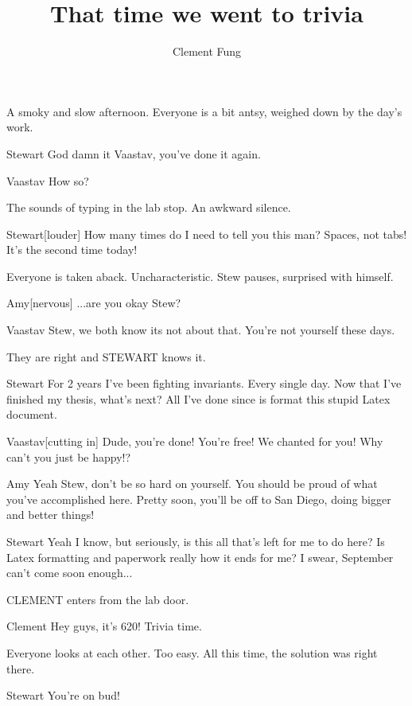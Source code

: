 \documentclass{screenplay}[2012/06/30]
\title{That time we went to trivia}
\author{Clement Fung}
\begin{document}
\coverpage

\fadein
{}

A smoky and slow afternoon. Everyone is a bit antsy, weighed down by the day's work.

\begin{dialogue}{Stewart} God damn it Vaastav, you've done it again. \end{dialogue}
\begin{dialogue}{Vaastav} How so? \end{dialogue}

The sounds of typing in the lab stop. An awkward silence.

\begin{dialogue}{Stewart}[louder] How many times do I need to tell you this man? Spaces, not tabs! It's the second time today! \end{dialogue}

Everyone is taken aback. Uncharacteristic. Stew pauses, surprised with himself. 

\begin{dialogue}{Amy}[nervous] ...are you okay Stew? \end{dialogue}
\begin{dialogue}{Vaastav} Stew, we both know its not about that. You're not yourself these days. \end{dialogue}

They are right and STEWART knows it.

\begin{dialogue}{Stewart} For 2 years I've been fighting invariants. Every single day. Now that I've finished my thesis, what's next? All I've done since is format this stupid Latex document. \end{dialogue}

\begin{dialogue}{Vaastav}[cutting in] Dude, you're done! You're free! We chanted for you! Why can't you just be happy!? \end{dialogue}

\begin{dialogue}{Amy} Yeah Stew, don't be so hard on yourself. You should be proud of what you've accomplished here. Pretty soon, you'll be off to San Diego, doing bigger and better things! \end{dialogue}

\begin{dialogue}{Stewart} Yeah I know, but seriously, is this all that's left for me to do here? Is Latex formatting and paperwork really how it ends for me? I swear, September can't come soon enough... \end{dialogue}

CLEMENT enters from the lab door.

\begin{dialogue}{Clement} Hey guys, it's 620! Trivia time. \end{dialogue}

Everyone looks at each other. Too easy. All this time, the solution was right there.

\begin{dialogue}{Stewart} You're on bud! \end{dialogue}

\fadeout
\theend
\end{document}

